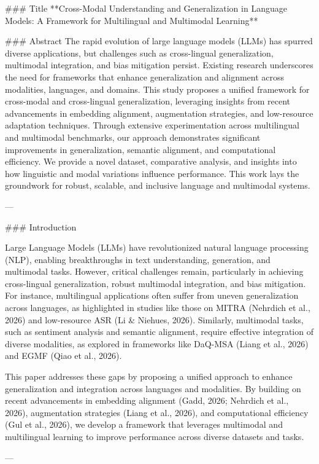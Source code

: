 ### Title
**Cross-Modal Understanding and Generalization in Language Models: A Framework for Multilingual and Multimodal Learning**

### Abstract
The rapid evolution of large language models (LLMs) has spurred diverse applications, but challenges such as cross-lingual generalization, multimodal integration, and bias mitigation persist. Existing research underscores the need for frameworks that enhance generalization and alignment across modalities, languages, and domains. This study proposes a unified framework for cross-modal and cross-lingual generalization, leveraging insights from recent advancements in embedding alignment, augmentation strategies, and low-resource adaptation techniques. Through extensive experimentation across multilingual and multimodal benchmarks, our approach demonstrates significant improvements in generalization, semantic alignment, and computational efficiency. We provide a novel dataset, comparative analysis, and insights into how linguistic and modal variations influence performance. This work lays the groundwork for robust, scalable, and inclusive language and multimodal systems.

---

### Introduction

Large Language Models (LLMs) have revolutionized natural language processing (NLP), enabling breakthroughs in text understanding, generation, and multimodal tasks. However, critical challenges remain, particularly in achieving cross-lingual generalization, robust multimodal integration, and bias mitigation. For instance, multilingual applications often suffer from uneven generalization across languages, as highlighted in studies like those on MITRA (Nehrdich et al., 2026) and low-resource ASR (Li & Niehues, 2026). Similarly, multimodal tasks, such as sentiment analysis and semantic alignment, require effective integration of diverse modalities, as explored in frameworks like DaQ-MSA (Liang et al., 2026) and EGMF (Qiao et al., 2026).

This paper addresses these gaps by proposing a unified approach to enhance generalization and integration across languages and modalities. By building on recent advancements in embedding alignment (Gadd, 2026; Nehrdich et al., 2026), augmentation strategies (Liang et al., 2026), and computational efficiency (Gul et al., 2026), we develop a framework that leverages multimodal and multilingual learning to improve performance across diverse datasets and tasks.

---

